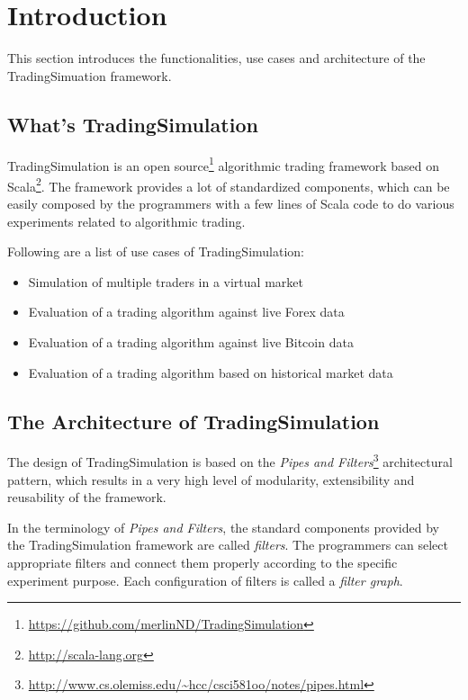 \section{Introduction}
\label{sec:1}

This section introduces the functionalities, use cases and architecture of the TradingSimuation framework.

\subsection{What's TradingSimulation}

TradingSimulation is an open source\footnote{\url{https://github.com/merlinND/TradingSimulation}} algorithmic trading framework based on Scala\footnote{\url{http://scala-lang.org}}. The framework provides a lot of standardized components, which can be easily composed by the programmers with a few lines of Scala code to do various experiments related to algorithmic trading.

Following are a list of use cases of TradingSimulation:

\begin{itemize}
\item Simulation of multiple traders in a virtual market
\item Evaluation of a trading algorithm against live Forex data
\item Evaluation of a trading algorithm against live Bitcoin data
\item Evaluation of a trading algorithm based on historical market data
\end{itemize}

\subsection{The Architecture of TradingSimulation}

The design of TradingSimulation is based on the \emph{Pipes and Filters}\footnote{\url{http://www.cs.olemiss.edu/~hcc/csci581oo/notes/pipes.html}} architectural pattern, which results in a very high level of modularity, extensibility and reusability of the framework.

In the terminology of \emph{Pipes and Filters}, the standard components provided by the TradingSimulation framework are called \emph{filters}. The programmers can select appropriate filters and connect them properly according to the specific experiment purpose. Each configuration of filters is called a \emph{filter graph}.

